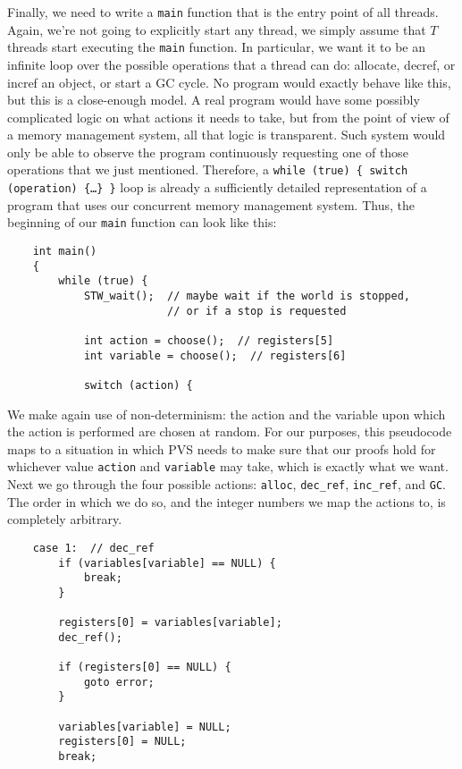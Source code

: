 Finally, we need to write a \texttt{main} function that is the entry point of all threads.
Again, we're not going to explicitly start any thread, we simply assume that $T$ threads start executing the \texttt{main} function.
In particular, we want it to be an infinite loop over the possible operations that a thread can do: allocate, decref, or incref an object, or start a GC cycle.
No program would exactly behave like this, but this is a close-enough model.
A real program would have some possibly complicated logic on what actions it needs to take, but from the point of view of a memory management system, all that logic is transparent.
Such system would only be able to observe the program continuously requesting one of those operations that we just mentioned.
Therefore, a \texttt{while (true) \{ switch (operation) \{\ldots\} \}} loop is already a sufficiently detailed representation of a program that uses our concurrent memory management system.
Thus, the beginning of our \texttt{main} function can look like this:
\begin{verbatim}
	int main()
	{
	    while (true) {
	        STW_wait();  // maybe wait if the world is stopped,
	                     // or if a stop is requested

	        int action = choose();  // registers[5]
	        int variable = choose();  // registers[6]

	        switch (action) {
\end{verbatim}

We make again use of non-determinism: the action and the variable upon which the action is performed are chosen at random.
For our purposes, this pseudocode maps to a situation in which PVS needs to make sure that our proofs hold for whichever value \texttt{action} and \texttt{variable} may take, which is exactly what we want.
Next we go through the four possible actions: \texttt{alloc}, \texttt{dec\_ref}, \texttt{inc\_ref}, and \texttt{GC}.
The order in which we do so, and the integer numbers we map the actions to, is completely arbitrary.
\begin{verbatim}
	case 1:  // dec_ref
	    if (variables[variable] == NULL) {
	        break;
	    }

	    registers[0] = variables[variable];
	    dec_ref();

	    if (registers[0] == NULL) {
	        goto error;
	    }

	    variables[variable] = NULL;
	    registers[0] = NULL;
	    break;
\end{verbatim}

